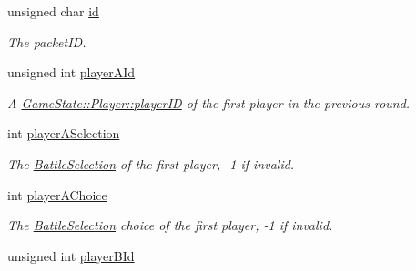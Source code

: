 \begin{DoxyCompactItemize}
\item 
\hypertarget{struct_packet_battle_prompt_selection_aaee299dad27b67f3a110f43bdb153483}{unsigned char \hyperlink{struct_packet_battle_prompt_selection_aaee299dad27b67f3a110f43bdb153483}{id}}\label{struct_packet_battle_prompt_selection_aaee299dad27b67f3a110f43bdb153483}

\begin{DoxyCompactList}\small\item\em The packet\-I\-D. \end{DoxyCompactList}\item 
\hypertarget{struct_packet_battle_prompt_selection_adf39f8101ce7fdca0cc6d6fcdd22c4b3}{unsigned int \hyperlink{struct_packet_battle_prompt_selection_adf39f8101ce7fdca0cc6d6fcdd22c4b3}{player\-A\-Id}}\label{struct_packet_battle_prompt_selection_adf39f8101ce7fdca0cc6d6fcdd22c4b3}

\begin{DoxyCompactList}\small\item\em A \hyperlink{class_game_state_1_1_player_acbd28d89e6eb8611aa66452ec31e9133}{Game\-State\-::\-Player\-::player\-I\-D} of the first player in the previous round. \end{DoxyCompactList}\item 
\hypertarget{struct_packet_battle_prompt_selection_afc4ee55b1a7dff6cb25bb47e2c517dea}{int \hyperlink{struct_packet_battle_prompt_selection_afc4ee55b1a7dff6cb25bb47e2c517dea}{player\-A\-Selection}}\label{struct_packet_battle_prompt_selection_afc4ee55b1a7dff6cb25bb47e2c517dea}

\begin{DoxyCompactList}\small\item\em The \hyperlink{group__server_ga729fc596fd91937095a8172eb71be582}{Battle\-Selection} of the first player, -\/1 if invalid. \end{DoxyCompactList}\item 
\hypertarget{struct_packet_battle_prompt_selection_abd26c08394d5c6e0bbadb794d07750e0}{int \hyperlink{struct_packet_battle_prompt_selection_abd26c08394d5c6e0bbadb794d07750e0}{player\-A\-Choice}}\label{struct_packet_battle_prompt_selection_abd26c08394d5c6e0bbadb794d07750e0}

\begin{DoxyCompactList}\small\item\em The \hyperlink{group__server_ga729fc596fd91937095a8172eb71be582}{Battle\-Selection} choice of the first player, -\/1 if invalid. \end{DoxyCompactList}\item 
\hypertarget{struct_packet_battle_prompt_selection_aa7108e4202c67ac30571bc3083277727}{unsigned int \hyperlink{struct_packet_battle_prompt_selection_aa7108e4202c67ac30571bc3083277727}{player\-B\-Id}}\label{struct_packet_battle_prompt_selection_aa7108e4202c67ac30571bc3083277727}


\end{DoxyCompactItemize}
